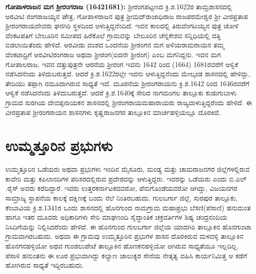 \textbf{ ಗೋಪಾಳರಾಜನ ಮಗ ಶ‍್ರೀರಂಗರಾಜ (16421681): } ಶ‍್ರೀರಂಗಪಟ್ಟಣದ ಕ್ರಿ.ಶ.1622ರ ತಾಮ್ರಶಾಸನದಲ್ಲಿ ಅರವೀಟಿ ರಂಗರಾಜಯ್ಯನ ಪೌತ್ರ, ಗೋಪಾಳರಾಜನ ಪುತ್ರ ಶ‍್ರೀಮದ್​ ರಾಜಾಧಿರಾಜ ರಾಜಪರಮೇಶ್ವರ ಶ‍್ರೀ ವೀರಪ್ರತಾಪ ಶ‍್ರೀರಂಗರಾಯದೇವರು ಘನಗಿರಿ ಸ್ಥಳದಿಂದ ಆಳುತ್ತಿದ್ದನೆಂದಿದೆ. ಇವನ ಕಾಲದಲ್ಲಿ ತಿರುವೆಂಗಟಯ್ಯನ ಪುತ್ರ ಚೋಳಿ ವೆಂಕಟಪತಿಗೆ ಬೇಲೂರಿನ ಸಮೀಪದ ಹಿರೆಕೊಲೆ ಗ್ರಾಮವನ್ನು ಬೇಲೂರಿನ ಚೆನ್ನಕೇಶವ ಸನ್ನಿಧಿಯಲ್ಲಿ ದತ್ತಿ ಬಿಡಲಾಯಿತೆಂದು ಹೇಳಿದೆ. ಅರವೀಡು ವಂಶದ ಒಂದನೆಯ ಶ‍್ರೀರಂಗನ ಮಗ ಅಳಿಯರಾಮರಾಯನ ತಮ್ಮ ವೆಂಕಟಾದ್ರಿಗೆ ಅರವೀಟಿರಂಗರಾಜ ಅಥವಾ ಶ‍್ರೀರಂಗ(ಐದನೇ ಶ‍್ರೀರಂಗ) ಎಂಬ ಮಗನಿದ್ದನು. ಇವನ ಮಗ ಗೋಪಾಲರಾಜ, ಇವನ ದತ್ತುಪುತ್ರನೇ ಆರನೆಯ ಶ‍್ರೀರಂಗ ಇವನು 1642 ರಿಂದ (1664) 1681ರವರೆಗೆ ಆಳ್ವಿಕೆ ನಡೆಸಿದನೆಂದು ತಿಳಿದುಬರುತ್ತದೆ. ಆದರೆ ಕ್ರಿ.ಶ.1622ರಲ್ಲೇ ಇವನು ಆಳುತ್ತಿದ್ದನೆಂದು ಮೇಲ್ಕಂಡ ಶಾಸನದಲ್ಲಿ ಹೇಳಿದ್ದು, ತೇದಿಯು ತಪ್ಪಾಗಿ ನಮೂದಾಗಿರುವ ಸಾಧ್ಯತೆ ಇದೆ. ಮೂರನೆಯ ಶ‍್ರೀರಂಗರಾಯನು ಕ್ರಿ.ಶ.1642 ರಿಂದ 1646ರವರೆಗೆ ಆಳ್ವಿಕೆ ನಡೆಸಿದನೆಂದು ತಿಳಿದುಬರುತ್ತದೆ. ಆದರೆ ಕ್ರಿ.ಶ.1640ಕ್ಕೆ ಸೇರಿದ ನಾಗಮಂಗಲ ತಾಲ್ಲೂಕು ಕುಡುಗುಬಾಳು ಗ್ರಾಮದ ಸುರಗಿಯ ದೇವಪ್ಪನಾಯಕನ ಶಾಸನದಲ್ಲಿ ಶ‍್ರೀರಂಗರಾಯಮಹಾರಾಯರು ರಾಜ್ಯವಾಳುತ್ತಿದ್ದರೆಂದು ಹೇಳಿದೆ. ಈ ವೀರಪ್ರತಾಪ ಶ‍್ರೀರಂಗರಾಯನ ಶಾಸನಗಳು ಕೃಷ್ಣರಾಜನಗರ ತಾಲ್ಲೂಕಿನ ಮಾರ್ಚಹಳ್ಳಿಯಲ್ಲೂ ದೊರಕಿದೆ.


\section{ಉಮ್ಮತ್ತೂರಿನ ಪ್ರಭುಗಳು}

ಉಮ್ಮತ್ತೂರಿನ ಒಡೆಯರು ಅಥವಾ ಪ್ರಭುಗಳು ಇಂದಿನ ಮೈಸೂರು, ಮಂಡ್ಯ ಮತ್ತು ಚಾಮರಾಜನಗರ ಜಿಲ್ಲೆಗಳಲ್ಲಿರುವ ಕಾವೇರಿ ಮತ್ತು ಕಪಿಲಾನದಿಗಳ ಪರಿಸರದಲ್ಲಿರುವ ಪ್ರದೇಶವನ್ನು ಆಳುತ್ತಿದ್ದರು. ಇವರನ್ನು ಒಡೆಯರು ಎಂದು ಬಿ.ಎಲ್​.ರೈಸ್​ ಅವರು ಕರೆದಿದ್ದಾರೆ. ಇವರು ಉತ್ತರಕರ್ನಾಟಕದವರೋ, ಪೆನುಗೊಂಡೆಯವರೋ ಆಗಿದ್ದು, ವಿಜಯನಗರ ಸಾಮ್ರಾಜ್ಯ ಸ್ಥಾಪನೆಯ ಕಾಲಕ್ಕೆ ದಕ್ಷಿಣಕ್ಕೆ ಬಂದು ನೆಲೆ ನಿಂತಿರಬಹುದು. ಗುಲಬರ್ಗಾ ಜಿಲ್ಲೆ, ಸುರಪುರ ತಾಲ್ಲೂಕು, ಕೆಂಬಾವಿಯ ಕ್ರಿ.ಶ.1341ರ ಒಂದು ಶಾಸನದಲ್ಲಿ ಹೊನಗುಂದ ನಾಮಗ್ರಾಮ ಮಹಾಪ್ರಭು ಬೆಸಣಿ(ಪೆಸಾಣಿ) ಹನುಮಂತ ಹಾಗೂ ಇತರ ಮೂವರು ಅಧಿಕಾರಿಗಳು ಸೇರಿ ಮಾಘಣಂದಿ ಸೈದ್ಧಾಂತಿಕ ಚಕ್ರವರ್ತಿಗಳ ಶಿಷ್ಯ ಚಂದ್ರನಂದಿಯ ನಿಸಿದಿಗೆಯನ್ನು ನಿಲ್ಲಿಸಿದರೆಂದು ಹೇಳಿದೆ. ಈ ಹೊನಗುಂದ ಗುಲಬರ್ಗಾ ಜಿಲ್ಲೆಯ ಯಾದಗಿರಿ ತಾಲ್ಲೂಕಿನ ಹೊನಗುಂಟಾ ಗ್ರಾಮವಾಗಿರಬಹುದು. ಅಥವಾ ಈ ಗ್ರಾಮವು ಉಮ್ಮತ್ತೂರಿನ ಪ್ರಭುಗಳ ಶಾಸನ ದೊರಕಿರುವ ಮಳವಳ್ಳಿ ತಾಲ್ಲೂಕಿನ ಹೊನಗನಹಳ್ಳಿಯೋ ಅಥವ ಗುಂಡಲುಪೇಟೆ ತಾಲ್ಲೂಕಿನ ಹೊಣಕನಹಳ್ಳಿಯೋ ಆಗಿರುವ ಸಾಧ್ಯತೆಯೂ ಇಲ್ಲದಿಲ್ಲ. ಪೆಸಾಳಿ ಹನುಂತನು ಈ ಊರ ಪ್ರಭುವಾಗಿದ್ದು ಕಲ್ಯಾಣ ಚಾಲುಕ್ಯರ ಸೇನೆಯ ನೇತೃತ್ವ ವಹಿಸಿ ಕಾರ್ಯನಿಮಿತ್ತ ಆ ಕಡೆಗೆ ಹೋಗಿರುವ ಸಾಧ್ಯತೆ ಇದ್ದಿರಬಹುದು. 

